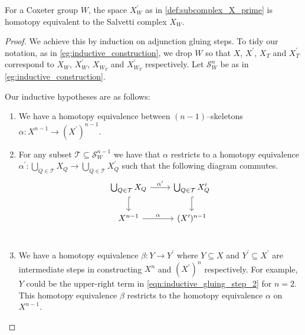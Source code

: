 \documentclass[class=article, crop=false]{standalone}
\begin{document}
\begin{theorem}
    \label{thm:salvetti_cx_equiv_X_prime}
    For a Coxeter group $W$, the space $X^\prime_W$ as in \cref{def:subcomplex_X_prime} is homotopy equivalent to the Salvetti complex $X_W$. 
\end{theorem}
\begin{proof}
    We achieve this by induction on adjunction gluing steps. To tidy our notation, as in \cref{eg:inductive_construction}, we drop $W$ so that $X$, $X^\prime$, $X_T$ and $X^\prime_T$ correspond to $X_W$, $X^\prime_W$, $X_{W_T}$ and $X^\prime_{W_T}$ respectively. Let $\mathcal{S}_W^n$ be as in \cref{eg:inductive_construction}.

    Our inductive hypotheses are as follows:

    \begin{enumerate}
        \item We have a homotopy equivalence between $(n-1)$--skeletons $\alpha \colon X^{n-1} \to (X^\prime)^{n-1}$.
        \item For any subset $\mathcal{T} \subseteq \mathcal{S}_W^{n-1}$ we have that $\alpha$ restricts to a homotopy equivalence $\alpha^\prime \colon \bigcup_{Q \in \mathcal{T}}X_Q \to \bigcup_{Q \in \mathcal{T}}X^\prime_Q$ such that the following diagram commutes.
        \begin{equation*}
            \begin{tikzcd}
    \bigcup_{Q \in \mathcal{T}} X_{Q} \ar[r, "\alpha^\prime" ] \ar[d, hookrightarrow]     &   \bigcup_{Q \in \mathcal{T}} X^\prime_{Q}  \ar[d, hookrightarrow]       \\
    X^{n-1}  \ar[r, "\alpha"]                                                                 &   (X^\prime)^{n-1}                                                  \\
            \end{tikzcd}
            \label{eqn:commutative_skeleton_inductive_hyp}  
        \end{equation*}
        \item We have a homotopy equivalence $\beta \colon Y \to Y^\prime$ where $Y \subseteq X$ and $Y^\prime \subseteq X^\prime$ are intermediate steps in constructing $X^n$ and $(X^\prime)^n$ respectively. For example, $Y$ could be the upper-right term in \eqref{eqn:inductive_gluing_step_2} for $n=2$. This homotopy equivalence $\beta$ restricts to the homotopy equivalence $\alpha$ on $X^{n-1}$.
    \end{enumerate}


\end{proof}
\end{document}
